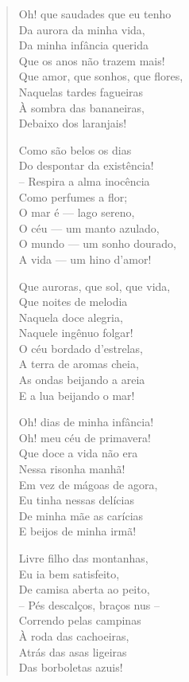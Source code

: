 \documentclass[10pt,a5paper,oneside]{book}
\begin{document}
\begin{verse}
Oh! que saudades que eu tenho\\
Da aurora da minha vida,\\
Da minha infância querida\\
Que os anos não trazem mais!\\
Que amor, que sonhos, que flores,\\
Naquelas tardes fagueiras\\
À sombra das bananeiras,\\
Debaixo dos laranjais!

Como são belos os dias\\
Do despontar da existência!\\
-- Respira a alma inocência\\
Como perfumes a flor;\\
O mar é --- lago sereno,\\
O céu --- um manto azulado,\\
O mundo --- um sonho dourado,\\
A vida --- um hino d'amor!

Que auroras, que sol, que vida,\\
Que noites de melodia\\
Naquela doce alegria,\\
Naquele ingênuo folgar!\\
O céu bordado d'estrelas,\\
A terra de aromas cheia,\\
As ondas beijando a areia\\
E a lua beijando o mar!

Oh! dias de minha infância!\\
Oh! meu céu de primavera!\\
Que doce a vida não era\\
Nessa risonha manhã!\\
Em vez de mágoas de agora,\\
Eu tinha nessas delícias\\
De minha mãe as carícias\\
E beijos de minha irmã!

Livre filho das montanhas,\\
Eu ia bem satisfeito,\\
De camisa aberta ao peito,\\
-- Pés descalços, braços nus --\\
Correndo pelas campinas\\
À roda das cachoeiras,\\
Atrás das asas ligeiras\\
Das borboletas azuis!


\end{verse}
\end{document}
